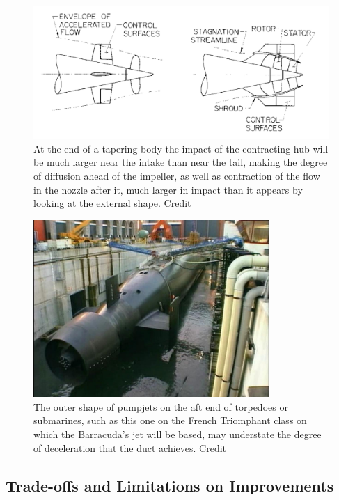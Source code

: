 \documentclass{article}\usepackage[]{graphicx}\usepackage[]{color}
\begin{document}
\begin{figure}[h]
\includegraphics[width=\textwidth]{Comparison.png}
\caption{At the end of a tapering body the impact of the contracting hub will be much larger near the intake than near the tail, making the degree of diffusion ahead of the impeller, as well as contraction of the flow in the nozzle after it, much larger in impact than it appears by looking at the external shape. Credit \cite{gearhart1966selection}}
\label{fig:Comparison.png}
\end{figure}

\begin{figure}[h]
\captionsetup{width=0.8\textwidth}
\includegraphics[width=0.8\textwidth, center]{Triomph.jpg}
\caption{The outer shape of pumpjets on the aft end of torpedoes or submarines, such as this one on the French Triomphant class on which the Barracuda's jet will be based, may understate the degree of deceleration that the duct achieves. Credit \cite{reddit2016}}
\label{fig:Triomph.jpg}
\end{figure}

\subsection{Trade-offs and Limitations on Improvements} \label{tradeoffs}
\end{document}
